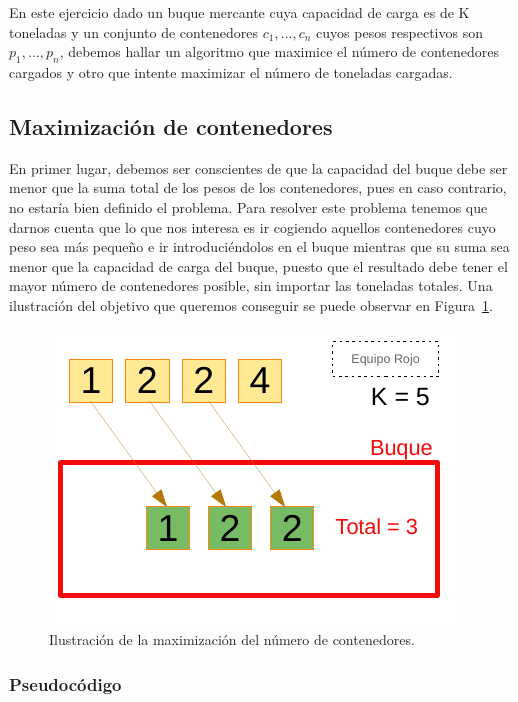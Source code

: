 En este ejercicio dado un buque mercante cuya capacidad de carga es de K toneladas y un conjunto de contenedores $c_1,...,c_n$ cuyos
pesos respectivos son $p_1,...,p_n$, debemos hallar un algoritmo que maximice el número de contenedores cargados y otro que intente 
maximizar el número de toneladas cargadas.

\subsection{Maximización de contenedores}

En primer lugar, debemos ser conscientes de que la capacidad del buque debe ser menor que la suma total de los pesos 
de los contenedores, pues en caso contrario, no estaría bien definido el problema. Para resolver este problema tenemos que darnos cuenta
que lo que nos interesa es ir cogiendo aquellos contenedores cuyo peso sea más pequeño e ir introduciéndolos en el buque mientras que su suma 
sea menor que la capacidad de carga del buque, puesto que el resultado debe tener el mayor número de contenedores posible, sin importar las 
toneladas totales. Una ilustración del objetivo que queremos conseguir se puede observar en Figura~\ref{fig:dib1}. 

\begin{figure}[H] 
    \centering
    \includegraphics[scale=1]{img/DibCont1.pdf}
    \caption{Ilustración de la maximización del número de contenedores.}
    \label{fig:dib1}
\end{figure}

\subsubsection{Pseudocódigo}

